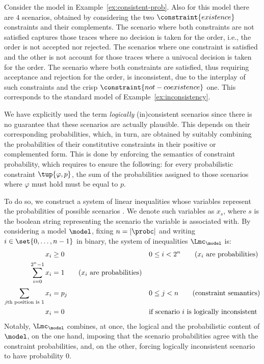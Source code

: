 \begin{example}
\label{ex:consistent-scenarios-2}
Consider the \pdeclare model in Example~\ref{ex:consistent-prob}. Also for this model there are $4$ scenarios, obtained by considering the two $\constraint{existence}$ constraints and their complements. The scenario where both constraints are not satisfied captures those traces where no decision is taken for the order, i.e., the order is not accepted nor rejected. The scenarios where one constraint is satisfied and the other is not account for those traces where a univocal decision is taken for the order. The scenario where both constraints are satisfied, thus requiring acceptance and rejection for the order, is inconsistent, due to the interplay of such constraints and the crisp $\constraint{not-coexistence}$ one. This corresponds to the standard \declare model of Example~\ref{ex:inconsistency}.
\end{example}

We have explicitly used the term \emph{logically} (in)consistent scenarios since there is no guarantee that these scenarios are actually plausible. This depends on their corresponding probabilities, which, in turn, are obtained by suitably combining the probabilities of their constitutive constraints in their positive or complemented form. This is done by enforcing the semantics of constraint probability, which requires to ensure the following: for every probabilistic constraint $\tup{\varphi,p}$, the sum of the probabilities assigned to those scenarios where $\varphi$ must hold must be equal to $p$.

To do so, we construct a system of linear inequalities whose variables represent the probabilities of possible scenarios \cite{MaMP20}. We denote such variables as $x_s$, where $s$ is the boolean string representing the scenario the variable is associated with. By considering a \pdeclare model $\model$, fixing $n = |\probc|$ and writing $i \in \set{0,\ldots,n-1}$ in binary, the system of inequalities $\Lmc_\model$ is:
\begin{align*}
x_i  &\geq  0  && 0\leq i < 2^n
  \tag{\text{$x_i$ are probabilities}} \\
 \sum_{i=0}^{2^n-1}x_i &= 1
  \tag{\text{$x_i$ are probabilities}}\\[2pt]
 \sum_{\text{$j$th position is 1}}x_i &= p_j &&  0\le j <n
  \tag{\text{constraint semantics}}\\
x_i &= 0 &&  \text{if scenario $i$ is logically inconsistent}
\end{align*}
Notably, $\Lmc_\model$ combines, at once, the logical and the probabilistic content of $\model$, on the one hand, imposing that the scenario probabilities agree with the constraint probabilities, and, on the other, forcing logically inconsistent scenario to have probability $0$.

